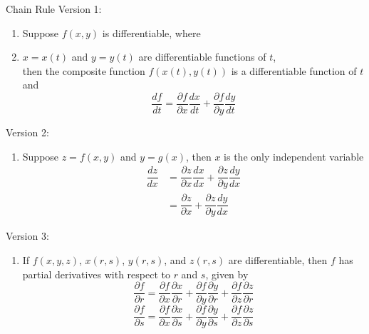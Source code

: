 \documentclass[10pt]{beamer}
\begin{document}
\begin{frame}[allowframebreaks]{Chain Rule}
Version 1:
\begin{enumerate}
	\item Suppose $f (x, y)$ is differentiable, where
	\item $x = x(t)$ and $y = y(t)$ are differentiable 	functions of $t$,
	\\then the composite function $f (x(t), y(t))$	is a differentiable function of $t$ and
	$$\dfrac{df}{dt} = \dfrac{\partial f}{\partial x}\dfrac{dx}{dt} + \dfrac{\partial f}{\partial y}\dfrac{dy}{dt}$$
\end{enumerate}

Version 2:
\begin{enumerate}
	\item Suppose $z = f (x, y)$ and $y = g(x)$, then $x$ is the only independent variable
	\begin{align*}
	\dfrac{dz}{dx} &= \dfrac{\partial z}{\partial x}\dfrac{dx}{dx} + \dfrac{\partial z}{\partial y}\dfrac{dy}{dx}
	\\&= \dfrac{\partial z}{\partial x} + \dfrac{\partial z}{\partial y}\dfrac{dy}{dx}
	\end{align*}
\end{enumerate}

\newpage
Version 3:
\begin{enumerate}
	\item If $f (x, y, z)$, $x(r, s)$, $y(r, s)$, and $z(r, s)$ are differentiable, then $f$ has partial
	derivatives with respect to $r$ and $s$, given by
	$$\dfrac{\partial f}{\partial r} = \dfrac{\partial f}{\partial x} \dfrac{\partial x}{\partial r} + \dfrac{\partial f}{\partial y} \dfrac{\partial y}{\partial r} + \dfrac{\partial f}{\partial z} \dfrac{\partial z}{\partial r}$$
		$$\dfrac{\partial f}{\partial s} = \dfrac{\partial f}{\partial x} \dfrac{\partial x}{\partial s} + \dfrac{\partial f}{\partial y} \dfrac{\partial y}{\partial s} + \dfrac{\partial f}{\partial z} \dfrac{\partial z}{\partial s}$$
\end{enumerate}


\end{frame}
\end{document}
